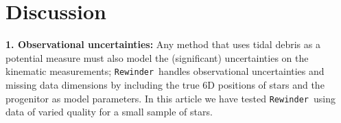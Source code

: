 \documentclass{emulateapj}
\newcommand{\rewinder}{\texttt{Rewinder}}
\begin{document}
%
%

\section{Discussion}\label{sec:discussion}

{\bf 1. Observational uncertainties:} Any method that uses tidal debris as a potential measure must also model the (significant) uncertainties on the kinematic measurements; \rewinder\ handles observational uncertainties and missing data dimensions by including the true 6D positions of stars and the progenitor as model parameters. In this article we have tested \rewinder\ using data of varied quality for a small sample of stars. 
\end{document}
